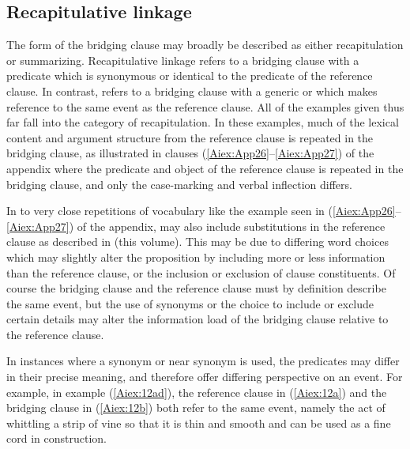 \documentclass[output=paper]{LSP/langsci}
\begin{document}
\subsection{Recapitulative linkage} 
\label{AiRecapitulative}
The form of the bridging clause may broadly be described as either recapitulation or summarizing. Recapitulative linkage refers to a bridging clause with a predicate which is synonymous or identical to the predicate of the reference clause. In contrast,  refers to a bridging clause with a generic or  which makes reference to the same event as the reference clause. All of the examples given thus far fall into the category of recapitulation. In these examples, much of the lexical content and argument structure from the reference clause is repeated in the bridging clause, as illustrated in clauses (\ref{Aiex:App26}--\ref{Aiex:App27}) of the appendix where the predicate and object of the reference clause is repeated in the bridging clause, and only the case-marking and verbal inflection differs.

In  to very close repetitions of vocabulary like the example seen in (\ref{Aiex:App26}--\ref{Aiex:App27}) of the appendix,  may also include substitutions in the reference clause as described in \citeauthor{guerin18} (this volume). This may be due to differing word choices which may slightly alter the proposition by including more or less information than the reference clause, or the inclusion or exclusion of clause constituents. Of course the bridging clause and the reference clause must by definition describe the same event, but the use of synonyms or the choice to include or exclude certain details may alter the information load of the bridging clause relative to the reference clause.

In instances where a synonym or near synonym is used, the predicates may differ in their precise meaning, and therefore offer differing perspective on an event. For example, in example (\ref{Aiex:12ad}), the reference clause in (\ref{Aiex:12a}) and the bridging clause in (\ref{Aiex:12b}) both refer to the same event, namely the act of whittling a strip of vine so that it is thin and smooth and can be used as a fine cord in construction.
\end{document}
